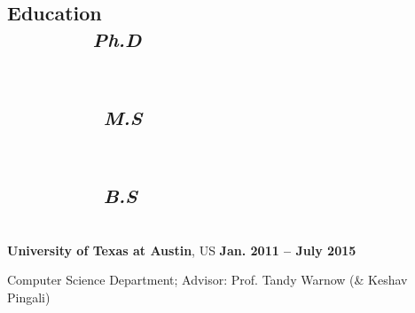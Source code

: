 \documentclass[margin,line,letterpaper]{resume}
\begin{document}
\begin{resume}
    \section{\mysidestyle Education\\ 
     ~~~~~~~~\textsl{Ph.D} \\  ~~\\ ~ \\~~~~~~~~~\textsl{M.S} \\  ~~\\ ~ \\~~~~~~~~~\textsl{B.S}}
    ~\\
    \textbf{University of Texas at Austin}, US  \hfill \textbf{ Jan. 2011 -- July 2015}\\\vspace{-4.5mm}%
    \begin{list2}
        \item Computer Science Department; Advisor:  Prof. Tandy Warnow (\& Keshav Pingali)
    \end{list2}\vspace{-1.5mm}
    

\end{resume}
\end{document}
